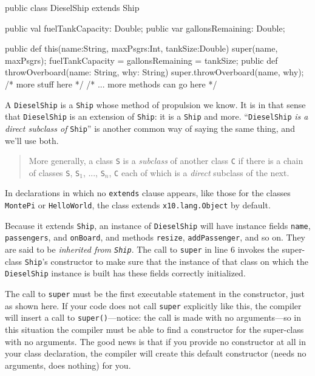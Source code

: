 \begin{xtennum}[]
 public class DieselShip extends Ship {
   public val fuelTankCapacity: Double; 
   public var gallonsRemaining: Double;
   
   public def this(name:String, maxPsgrs:Int, tankSize:Double) {
      super(name, maxPsgrs);
      fuelTankCapacity = gallonsRemaining = tankSize;
   }
   public def throwOverboard(name: String, why: String) {
     super.throwOverboard(name, why);
     /* more stuff here */
   }
   /* ... more methods can go here */
}
\end{xtennum}

A {\tt DieselShip} is a {\tt Ship} whose method of propulsion we know.  It is
in that sense that {\tt DieselShip} is an extension of {\tt Ship}: it is a
{\tt Ship} and more.  ``{\tt DieselShip} {\em is a direct
subclass of} {\tt Ship}'' is another common way of saying the same thing,
and we'll use both.
 \begin{quote}
More generally, a class {\tt S} is a {\em subclass} of another class {\tt C} if
there is a chain of classes {\tt S}, {\tt S$_{1}$}, ..., {\tt S$_{n}$}, {\tt C}
each of which is a {\em direct} subclass of the next.
\end{quote}
In declarations in which no {\tt extends}
clause appears, like those for the classes {\tt MontePi} or {\tt HelloWorld}, 
the class extends {\tt x10.lang.Object} by default.

Because it extends {\tt Ship}, an instance of {\tt DieselShip} will have
instance fields {\tt name}, {\tt passengers}, and {\tt on\-Board}, and methods
{\tt resize}, {\tt add\-Pas\-sen\-ger}, and so on.  They are said to be {\em
inherited from {\tt Ship}}.  The call to {\tt super} in line 6 invokes the
super-class {\tt Ship}'s constructor to make sure that the instance of that
class on which the {\tt DieselShip} instance is built has these fields correctly
initialized. 

The call to {\tt super} must be the first executable statement in the
constructor, just as shown here.  If your code does not call {\tt super}
explicitly like this, the compiler will insert a call to {\tt super()}---notice:
the call is made with no arguments---so in this situation the compiler must be able to
find a constructor for the super-class with no arguments. The good news is that
if you provide no constructor at all in your class declaration, the compiler will
create this default constructor (needs no arguments, does nothing) for you.

